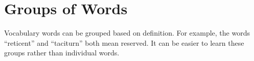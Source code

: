\section{Groups of Words}
Vocabulary words can be grouped based on definition. For example, the words ``reticent'' and ``taciturn'' both mean reserved. It can be easier to learn these groups rather than individual words.
